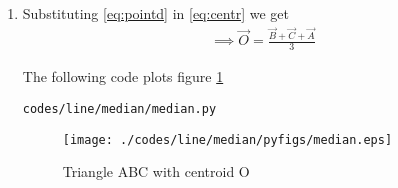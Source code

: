 \renewcommand{\theequation}{\theenumi}
\begin{enumerate}[label=\thesection.\arabic*.,ref=\thesection.\theenumi]

\item Substituting \ref{eq:pointd} in \ref{eq:centr} we get
\begin{align}
\implies \vec{O}=\frac{\vec{B}+\vec{C}+\vec{A}}{3}
\end{align}

The following code plots figure \ref{fig:median}
\begin{lstlisting}
codes/line/median/median.py
\end{lstlisting}
\begin{figure}[!ht]
\centering
\texttt{[image: ./codes/line/median/pyfigs/median.eps]}
\caption{Triangle ABC with centroid O}
\label{fig:median}
\end{figure}

\end{enumerate}
